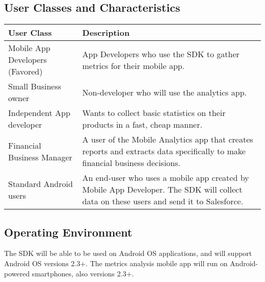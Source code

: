 \documentclass[12pt,oneside,letterpaper]{article}
\begin{document}
\subsection{User Classes and Characteristics}
\begin{tabular}{|l|p{3.8in}|}
\hline
\textbf{User Class}& \textbf{Description} \\
\hline
Mobile App Developers (Favored) & App Developers who use the SDK to gather metrics for their mobile app.\tabularnewline
\hline
Small Business owner & Non-developer who will use the analytics app.\tabularnewline
\hline
Independent App developer & Wants to collect basic statistics on their products in a fast, cheap manner.\tabularnewline
\hline
Financial Business Manager & A user of the Mobile Analytics app that creates reports and extracts data specifically to make financial business decisions.\tabularnewline
\hline
Standard Android users & An end-user who uses a mobile app created by Mobile App Developer. The SDK will collect data on these users and send it to Salesforce.\tabularnewline
\hline
\end{tabular}

\subsection{Operating Environment}
The SDK will be able to be used on Android OS applications, and will support Android OS versions 2.3+. The metrics analysis mobile app will run on Android-powered smartphones, also versions 2.3+. 
\end{document}
